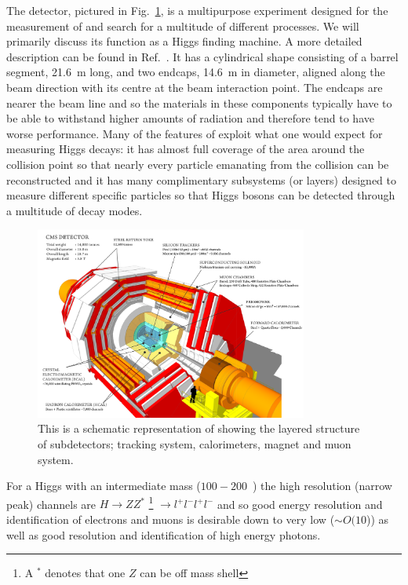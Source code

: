 The \CMS detector, pictured in Fig.~\ref{fig:cms_diagram}, is a multipurpose experiment designed for the measurement of and search for a multitude of different processes. We will primarily discuss its function as a Higgs finding machine. A more detailed description can be found in Ref.~\cite{CMS_JINST}. It has a cylindrical shape consisting of a barrel segment, 21.6~m long, and two endcaps, 14.6~m in diameter, aligned along the beam direction with its centre at the beam interaction point. The endcaps are nearer the beam line and so the materials in these components typically have to be able to withstand higher amounts of radiation and therefore tend to have worse performance. Many of the features of \CMS exploit what one would expect for measuring Higgs decays: it has almost full coverage of the area around the collision point so that nearly every particle emanating from the collision can be reconstructed and it has many complimentary subsystems (or layers) designed to measure different specific particles so that Higgs bosons can be detected through a multitude of decay modes. 

\begin{figure}
  \includegraphics[width=0.8\textwidth]{cms_experiment/plots/cms_diagram.png}
  \caption[\acs{CMS} diagram]{This is a schematic representation of \CMS showing the layered structure of subdetectors; tracking system, calorimeters, magnet and muon system.}
  \label{fig:cms_diagram}
\end{figure}


For a Higgs with an intermediate mass ($100 - 200$~\GeV) the high resolution (narrow peak) channels are $H\rightarrow ZZ^{*}$ \footnote{A $^{*}$ denotes that one $Z$ can be off mass shell} $\rightarrow l^{+}l^{-}l^{+}l^{-}$ and \Hgg so good energy resolution and identification of electrons and muons is desirable down to very low \pT ($\sim O(10$\GeV)) as well as good resolution and identification of high energy photons. 

